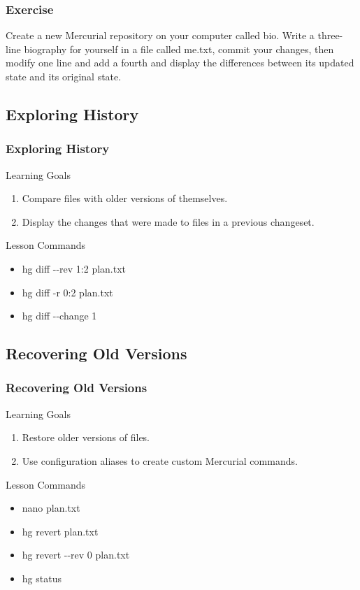\documentclass{beamer}
\renewcommand{\dh}{{-}{-}}
\begin{document}
\begin{frame}
\frametitle{Exercise}
Create a new Mercurial repository on your computer called bio. Write a three-line biography for yourself in a file called me.txt, commit your changes, then modify one line and add a fourth and display the differences between its updated state and its original state.
\end{frame}



\subsection*{Exploring History}
\begin{frame}
\frametitle{Exploring History}
\begin{block}{Learning Goals}
\begin{enumerate}
\item Compare files with older versions of themselves.
\item Display the changes that were made to files in a previous changeset.
\end{enumerate}
\end{block}
\begin{block}{Lesson Commands}
\begin{multicols}{2}
\begin{itemize}
\item hg diff \dh rev 1:2 plan.txt
\item hg diff -r 0:2 plan.txt
\item hg diff \dh change 1
\end{itemize}
\end{multicols}
\end{block}
\end{frame}


\subsection*{Recovering Old Versions}
\begin{frame}
\frametitle{Recovering Old Versions}
\begin{block}{Learning Goals}
\begin{enumerate}
\item Restore older versions of files.
\item Use configuration aliases to create custom Mercurial commands.
\end{enumerate}
\end{block}
\begin{block}{Lesson Commands}
\begin{multicols}{2}
\begin{itemize}
\item nano plan.txt
\item hg revert plan.txt
\item hg revert \dh rev 0 plan.txt
\item hg status
\end{itemize}
\end{multicols}
\end{block}
\end{frame}
\end{document}
